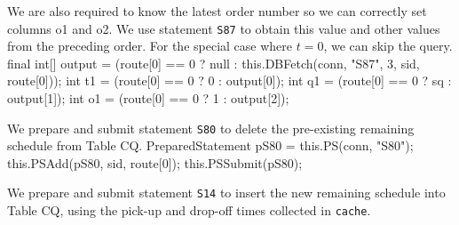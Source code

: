 \documentclass{article}
\def\nwendcode{\endtrivlist \endgroup}      %
\let\nwdocspar=\par
\theoremstyle{definition}                   %
\begin{document}
{\small We are also required to know the latest order number so we can
correctly set columns \textsf{o1} and \textsf{o2}. We use statement {\tt{}\protect{}S87} to
obtain this value and other values from the preceding order. For the special
case where $t=0$, we can skip the query.}
\nwenddocs{}\endmoddef{}
final int[] output = (route[0] == 0 ? null : this.DBFetch(conn, "S87", 3, sid, route[0]));
int t1 = (route[0] == 0 ?  0 : output[0]);
int q1 = (route[0] == 0 ? sq : output[1]);
int o1 = (route[0] == 0 ?  1 : output[2]);
\nwendcode{}\nwdocspar
{\small We prepare and submit statement {\tt{}\protect{}S80} to delete the pre-existing
remaining schedule from Table CQ.}
\nwenddocs{}\endmoddef{}
PreparedStatement pS80 = this.PS(conn, "S80");
this.PSAdd(pS80, sid, route[0]);
this.PSSubmit(pS80);
\nwendcode{}\nwdocspar
{\small We prepare and submit statement {\tt{}\protect{}S14} to insert the new remaining
schedule into Table CQ, using the pick-up and drop-off times collected in
{\tt{}cache}.}
\nwenddocs{}\endmoddef{}
\end{document}
